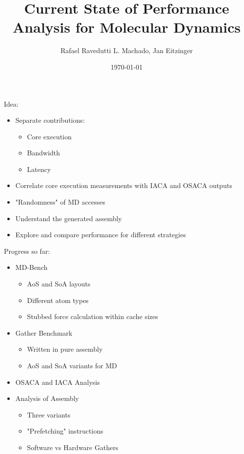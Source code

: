 \documentclass[aspectratio=169,t]{beamer}
\title[MD Performance Analysis]{Current State of Performance Analysis for Molecular Dynamics}
\author[Rafael Ravedutti L. Machado, Jan Eitzinger]{Rafael Ravedutti L. Machado, Jan Eitzinger}
\institute[NHR@FAU]{Erlangen National High Performance Computing Center (NHR@FAU)}
\date{\today}
\begin{document}
  \maketitle

  { %
    \begin{frame}[noframenumbering]{Idea:}
        \begin{itemize}
            \item Separate contributions:
            \begin{itemize}
                \item Core execution
                \item Bandwidth
                \item Latency
            \end{itemize}
            \item Correlate core execution measurements with IACA and OSACA outputs
            \item "Randomness" of MD accesses
            \item Understand the generated assembly
            \item Explore and compare performance for different strategies
        \end{itemize}
    \end{frame}
  }
  \begin{frame}[noframenumbering]{Progress so far:}
      \begin{itemize}
          \item MD-Bench
          \begin{itemize}
              \item AoS and SoA layouts
              \item Different atom types
              \item Stubbed force calculation within cache sizes
          \end{itemize}
          \item Gather Benchmark
          \begin{itemize}
              \item Written in pure assembly
              \item AoS and SoA variants for MD
          \end{itemize}
          \item OSACA and IACA Analysis
          \item Analysis of Assembly
          \begin{itemize}
              \item Three variants
              \item "Prefetching" instructions
              \item Software vs Hardware Gathers
          \end{itemize}
      \end{itemize}
  \end{frame}
\end{document}
